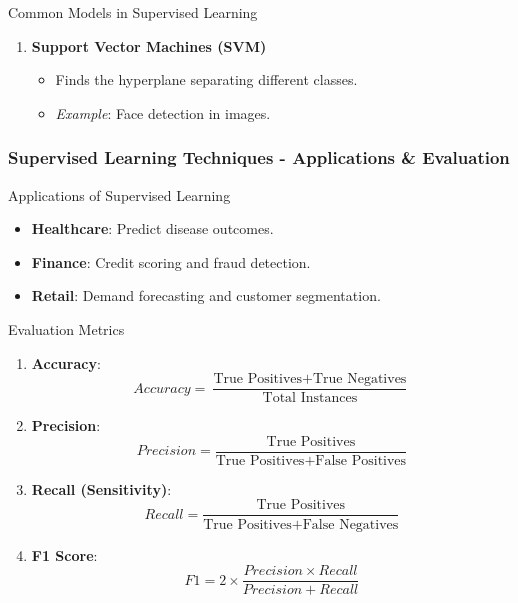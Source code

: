 \documentclass[aspectratio=169]{beamer}
\begin{document}
\begin{frame}[fragile]
\begin{block}{Common Models in Supervised Learning}
\begin{enumerate}
            \item \textbf{Support Vector Machines (SVM)}
                \begin{itemize}
                    \item Finds the hyperplane separating different classes.
                    \item \textit{Example}: Face detection in images.
                \end{itemize}
        \end{enumerate}
    \end{block}
\end{frame}

\begin{frame}[fragile]
    \frametitle{Supervised Learning Techniques - Applications & Evaluation}
    \begin{block}{Applications of Supervised Learning}
        \begin{itemize}
            \item \textbf{Healthcare}: Predict disease outcomes.
            \item \textbf{Finance}: Credit scoring and fraud detection.
            \item \textbf{Retail}: Demand forecasting and customer segmentation.
        \end{itemize}
    \end{block}

    \begin{block}{Evaluation Metrics}
        \begin{enumerate}
            \item \textbf{Accuracy}: 
                \begin{equation} 
                    Accuracy = \frac{\text{True Positives} + \text{True Negatives}}{\text{Total Instances}} 
                \end{equation}
            \item \textbf{Precision}: 
                \begin{equation} 
                    Precision = \frac{\text{True Positives}}{\text{True Positives} + \text{False Positives}} 
                \end{equation}
            \item \textbf{Recall (Sensitivity)}: 
                \begin{equation} 
                    Recall = \frac{\text{True Positives}}{\text{True Positives} + \text{False Negatives}} 
                \end{equation}
            \item \textbf{F1 Score}: 
                \begin{equation} 
                    F1 = 2 \times \frac{Precision \times Recall}{Precision + Recall} 
                \end{equation}
        \end{enumerate}
    \end{block}
    

\end{frame}
\end{document}
